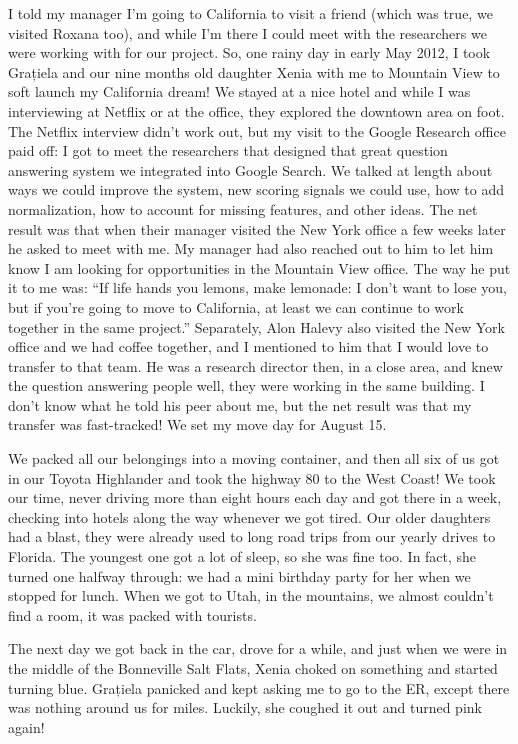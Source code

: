 \documentclass[12pt]{book}
\begin{document}
I told my manager I'm going to California to visit a friend (which was
true, we visited Roxana too), and while I'm there I could meet with the
researchers we were working with for our project. So, one rainy day in
early May 2012, I took Grațiela and our nine months old daughter Xenia
with me to Mountain View to soft launch my California dream! We stayed
at a nice hotel and while I was interviewing at Netflix or at the
office, they explored the downtown area on foot. The Netflix interview
didn't work out, but my visit to the Google Research office paid off: I
got to meet the researchers that designed that great question answering
system we integrated into Google Search. We talked at length about ways
we could improve the system, new scoring signals we could use, how to
add normalization, how to account for missing features, and other ideas.
The net result was that when their manager visited the New York office a
few weeks later he asked to meet with me. My manager had also reached
out to him to let him know I am looking for opportunities in the
Mountain View office. The way he put it to me was: ``If life hands you
lemons, make lemonade: I don't want to lose you, but if you're going to
move to California, at least we can continue to work together in the
same project.'' Separately, Alon Halevy also visited the New York office
and we had coffee together, and I mentioned to him that I would love to
transfer to that team. He was a research director then, in a close area,
and knew the question answering people well, they were working in the
same building. I don't know what he told his peer about me, but the net
result was that my transfer was fast-tracked! We set my move day for
August 15.

We packed all our belongings into a moving container, and then all six
of us got in our Toyota Highlander and took the highway 80 to the West
Coast! We took our time, never driving more than eight hours each day
and got there in a week, checking into hotels along the way whenever we
got tired. Our older daughters had a blast, they were already used to
long road trips from our yearly drives to Florida. The youngest one got
a lot of sleep, so she was fine too. In fact, she turned one halfway
through: we had a mini birthday party for her when we stopped for lunch.
When we got to Utah, in the mountains, we almost couldn't find a room,
it was packed with tourists.

The next day we got back in the car, drove for a while, and just when we
were in the middle of the Bonneville Salt Flats, Xenia choked on
something and started turning blue. Grațiela panicked and kept asking me
to go to the ER, except there was nothing around us for miles. Luckily,
she coughed it out and turned pink again!
\end{document}
